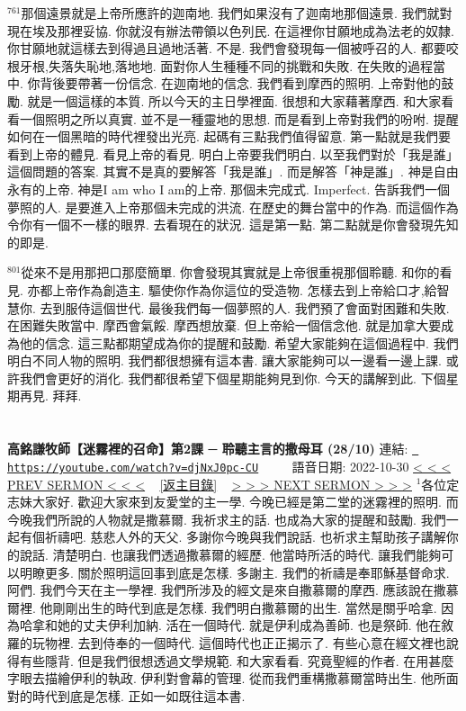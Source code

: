 \documentclass{book}
\begin{document}
$^{761}$那個遠景就是上帝所應許的迦南地.
我們如果沒有了迦南地那個遠景.
我們就對現在埃及那裡妥協.
你就沒有辦法帶領以色列民.
在這裡你甘願地成為法老的奴隸.
你甘願地就這樣去到得過且過地活著.
不是.
我們會發現每一個被呼召的人.
都要咬根牙根,失落失恥地,落地地.
面對你人生種種不同的挑戰和失敗.
在失敗的過程當中.
你背後要帶著一份信念.
在迦南地的信念.
我們看到摩西的照明.
上帝對他的鼓勵.
就是一個這樣的本質.
所以今天的主日學裡面.
很想和大家藉著摩西.
和大家看看一個照明之所以真實.
並不是一種靈地的思想.
而是看到上帝對我們的吩咐.
提醒如何在一個黑暗的時代裡發出光亮.
起碼有三點我們值得留意.
第一點就是我們要看到上帝的體見.
看見上帝的看見.
明白上帝要我們明白.
以至我們對於「我是誰」這個問題的答案.
其實不是真的要解答「我是誰」.
而是解答「神是誰」.
神是自由永有的上帝.
神是I am who I am的上帝.
那個未完成式.
Imperfect.
告訴我們一個夢照的人.
是要進入上帝那個未完成的洪流.
在歷史的舞台當中的作為.
而這個作為令你有一個不一樣的眼界.
去看現在的狀況.
這是第一點.
第二點就是你會發現先知的即是.

$^{801}$從來不是用那把口那麼簡單.
你會發現其實就是上帝很重視那個聆聽.
和你的看見.
亦都上帝作為創造主.
驅使你作為你這位的受造物.
怎樣去到上帝給口才,給智慧你.
去到服侍這個世代.
最後我們每一個夢照的人.
我們預了會面對困難和失敗.
在困難失敗當中.
摩西會氣餒.
摩西想放棄.
但上帝給一個信念他.
就是加拿大要成為他的信念.
這三點都期望成為你的提醒和鼓勵.
希望大家能夠在這個過程中.
我們明白不同人物的照明.
我們都很想擁有這本書.
讓大家能夠可以一邊看一邊上課.
或許我們會更好的消化.
我們都很希望下個星期能夠見到你.
今天的講解到此.
下個星期再見.
拜拜.
\newpage



\section{}
\label{sec:djNxJ0pc_CU}
\textbf{高銘謙牧師【迷霧裡的召命】第2課 ─ 聆聽主言的撒母耳 (28/10)}
\newline
\newline
連結: \href{https://youtube.com/watch?v=djNxJ0pc-CU}{\texttt{ https://youtube.com/watch?v=djNxJ0pc-CU}} ~~~~ 語音日期: 2022-10-30 
\newline
\newline
\hyperref[sec:liEtjDNazis]{\small{< < < PREV SERMON < < <}}
~
\hyperref[sec:index]{\small{[返主目錄]}}
~
\hyperref[sec:H4gdcVXwfVM]{\small{> > > NEXT SERMON > > >}}
\newline
\newline
$^{1}$各位定志妹大家好.
歡迎大家來到友愛堂的主一學.
今晚已經是第二堂的迷霧裡的照明.
而今晚我們所說的人物就是撒慕爾.
我祈求主的話.
也成為大家的提醒和鼓勵.
我們一起有個祈禱吧.
慈悲人外的天父.
多謝你今晚與我們說話.
也祈求主幫助孩子講解你的說話.
清楚明白.
也讓我們透過撒慕爾的經歷.
他當時所活的時代.
讓我們能夠可以明瞭更多.
關於照明這回事到底是怎樣.
多謝主.
我們的祈禱是奉耶穌基督命求.
阿們.
我們今天在主一學裡.
我們所涉及的經文是來自撒慕爾的摩西.
應該說在撒慕爾裡.
他剛剛出生的時代到底是怎樣.
我們明白撒慕爾的出生.
當然是關乎哈拿.
因為哈拿和她的丈夫伊利加納.
活在一個時代.
就是伊利成為善師.
也是祭師.
他在敘羅的玩物裡.
去到侍奉的一個時代.
這個時代也正正揭示了.
有些心意在經文裡也說得有些隱背.
但是我們很想透過文學規範.
和大家看看.
究竟聖經的作者.
在用甚麼字眼去描繪伊利的執政.
伊利對會幕的管理.
從而我們重構撒慕爾當時出生.
他所面對的時代到底是怎樣.
正如一如既往這本書.
\end{document}
